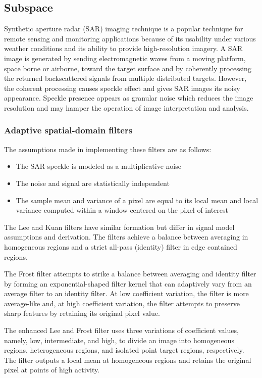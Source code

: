 \subsection{Subspace}
Synthetic aperture radar (SAR) imaging technique is a popular technique for remote sensing and monitoring applications because of its usability under various weather conditions and its ability to provide high-resolution imagery. A SAR image is generated by sending electromagnetic waves from a moving platform, space borne or airborne, toward the target surface and by coherently processing the returned backscattered signals from multiple distributed targets. However, the coherent processing causes speckle effect and gives SAR images its noisy appearance. Speckle presence appears as granular noise which reduces the image resolution and may hamper the operation of image interpretation and analysis.

\subsubsection{Adaptive spatial-domain filters}
The assumptions made in implementing these filters are as follows:

\begin{itemize}
	\item The SAR speckle is modeled as a multiplicative noise
	\item The noise and signal are statistically independent
	\item The sample mean and variance of a pixel are equal to its local mean and local variance computed within a window centered on the pixel of interest
\end{itemize}

The Lee and Kuan filters have similar formation but differ in signal model assumptions and derivation. The  filters achieve a balance between averaging in homogeneous regions and a strict all-pass (identity) filter in edge contained regions. 

The Frost filter attempts to strike a balance between averaging and identity filter by forming an exponential-shaped filter kernel that can adaptively vary from an average filter to an identity filter. At low coefficient variation, the filter is more average-like and, at high coefficient variation, the filter attempts to preserve sharp features by retaining its original pixel value.

The enhanced Lee and Frost filter uses three variations of coefficient values, namely, low, intermediate, and high, to divide an image into homogeneous regions,
heterogeneous regions, and isolated point target regions, respectively. The filter outputs a local mean at homogeneous regions and retains the original pixel at points of high activity.

